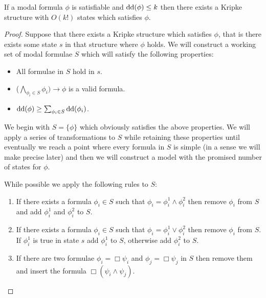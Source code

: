 \documentclass{llncs}
\newcommand{\dd}{\ensuremath \textrm{dd}}
\begin{document}
\begin{theorem}

If a modal formula $\phi$ is satisfiable and $\dd(\phi)\le k$ then there exists
a Kripke structure with $O(k!)$ states which satisfies $\phi$.

\end{theorem}

\begin{proof}

Suppose that there exists a Kripke structure which satisfies $\phi$, that is
there exists some state $s$ in that structure where $\phi$ holds. We will
construct a working set of modal formulae $S$ which will satisfy the following
properties:

\begin{itemize}

\item All formulae in $S$ hold in $s$.

\item ($\bigwedge_{\phi_i\in S} \phi_i) \to \phi$ is a valid formula.

\item $\dd(\phi) \ge \sum_{\phi_i\in S} \dd(\phi_i) $.

\end{itemize}

We begin with $S=\{\phi\}$ which obviously satisfies the above properties. We
will apply a series of transformations to $S$ while retaining these properties
until eventually we reach a point where every formula in $S$ is simple (in a
sense we will make precise later) and then we will construct a model with the
promised number of states for $\phi$.

While possible we apply the following rules to $S$:

\begin{enumerate}

\item If there exists a formula $\phi_i\in S$ such that $\phi_i = \phi_i^1
\land \phi_i^2$ then remove $\phi_i$ from $S$ and add $\phi_i^1$ and $\phi_i^2$
to $S$.

\item If there exists a formula $\phi_i\in S$ such that $\phi_i = \phi_i^1
\lor \phi_i^2$ then remove $\phi_i$ from $S$. If $\phi_i^1$ is true
in state $s$ add $\phi_i^1$ to $S$, otherwise add $\phi_i^2$ to $S$.

\item If there are two formulae $\phi_i = \Box \psi_i$ and $\phi_j=\Box \psi_j$
in $S$ then remove them and insert the formula $\Box (\psi_i \land \psi_j)$.


\end{enumerate}
\end{proof}
\end{document}
